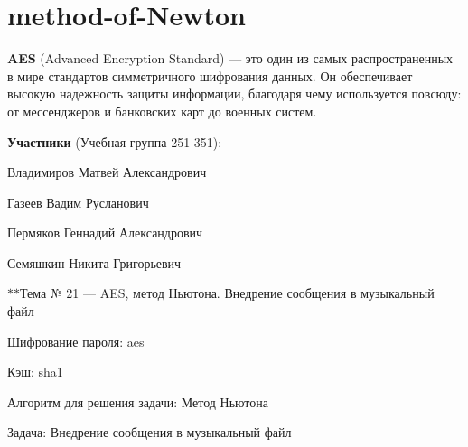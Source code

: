 \chapter{method-\/of-\/\+Newton }
\hypertarget{md__r_e_a_d_m_e}{}\label{md__r_e_a_d_m_e}
\label{md__r_e_a_d_m_e_autotoc_md0}%
%




{\bfseries{AES}} (Advanced Encryption Standard) — это один из самых распространенных в мире стандартов симметричного шифрования данных. Он обеспечивает высокую надежность защиты информации, благодаря чему используется повсюду:\+ от мессенджеров и банковских карт до военных систем.

{\bfseries{Участники}} (Учебная группа 251-\/351):\+ ~\newline

\begin{DoxyItemize}
\item Владимиров Матвей Александрович
\item Газеев Вадим Русланович
\item Пермяков Геннадий Александрович
\item Семяшкин Никита Григорьевич
\end{DoxyItemize}



\texorpdfstring{$\ast$}{*}\texorpdfstring{$\ast$}{*}Тема № 21 — AES, метод Ньютона. Внедрение сообщения в музыкальный файл


\begin{DoxyItemize}
\item Шифрование пароля:\+ aes
\item Кэш:\+ sha1
\item Алгоритм для решения задачи:\+ Метод Ньютона
\item Задача:\+ Внедрение сообщения в музыкальный файл
\end{DoxyItemize}

 